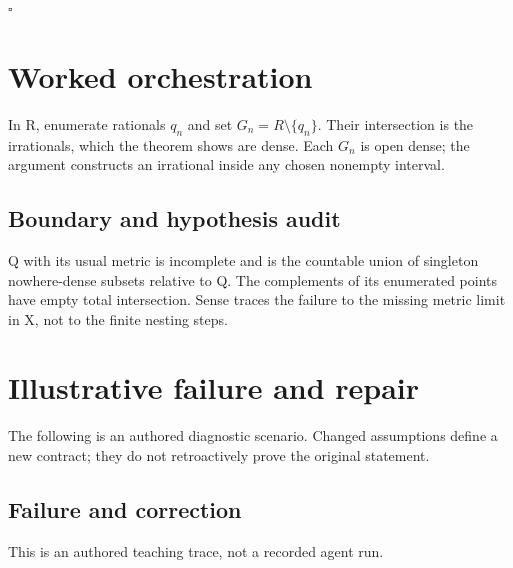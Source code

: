 \documentclass[preprint,12pt,aps,pra,showkeys,amsmath,amssymb,superscriptaddress,floatfix]{revtex4-2}
\theoremstyle{definition}
\theoremstyle{remark}
\begin{document}
\hfill$\square$

\section{Worked orchestration}

In R, enumerate rationals \(q_n\) and set \(G_n=R\setminus\{q_n\}\).
Their intersection is the irrationals, which the theorem shows are
dense. Each \(G_n\) is open dense; the argument constructs an irrational
inside any chosen nonempty interval.

\subsection{Boundary and hypothesis audit}

Q with its usual metric is incomplete and is the countable union of
singleton nowhere-dense subsets relative to Q. The complements of its
enumerated points have empty total intersection. Sense traces the
failure to the missing metric limit in X, not to the finite nesting
steps.

\section{Illustrative failure and repair}

The following is an authored diagnostic scenario. Changed assumptions
define a new contract; they do not retroactively prove the original
statement.

\subsection{Failure and correction}
This is an authored teaching trace, not a recorded agent run.
\end{document}
